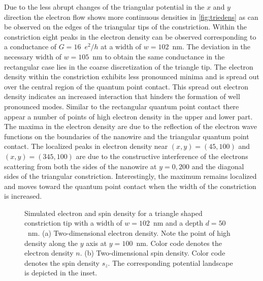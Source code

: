 Due to the less abrupt changes of the triangular potential in the $x$ and $y$ direction the electron flow shows more continuous densities in \cref{fig:triedens} as can be observed on the edges of the triangular tips of the constriction. Within the constriction eight peaks in the electron density can be observed corresponding to a conductance of $G=16$~$e^2/h$ at a width of $w=102$~nm. The deviation in the necessary width of $w=105$~nm to obtain the same conductance in the rectangular case lies in the coarse discretization of the triangle tip. The electron density within the constriction exhibits less pronounced minima and is spread out over the central region of the quantum point contact. This spread out electron density indicates an increased interaction that hinders the formation of well pronounced modes. Similar to the rectangular quantum point contact there appear a number of points of high electron density in the upper and lower part. The maxima in the electron density are due to the reflection of the electron wave functions on the boundaries of the nanowire and the triangular quantum point contact. The localized peaks in electron density near $(x,y) = (45,100)$ and $(x,y) = (345,100)$ are due to the constructive interference of the electrons scattering from both the sides of the nanowire at $y=0,200$ and the diagonal sides of the triangular constriction. Interestingly, the maximum remains localized and moves toward the quantum point contact when the width of the constriction is increased.\par
\begin{figure}[h!]
  \hspace{14pt}
  \hspace{4pt}
  \caption{Simulated electron and spin density for a triangle shaped constriction tip with a width of $w=102$~nm and a depth $d=50$~nm. (a) Two-dimensional electron density. Note the point of high density along the $y$ axis at $y=100$~nm. Color code denotes the electron density $n$. (b) Two-dimensional spin density.  Color code denotes the spin density $s_z$. The corresponding potential landscape is depicted in the inset.}
\end{figure}
